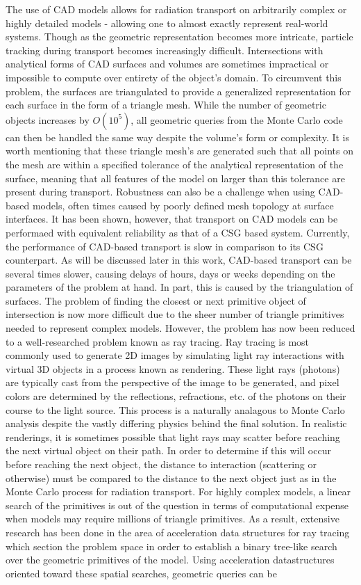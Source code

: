 \documentclass[12pt, a4paper]{article}
\begin{document}
The use of CAD models allows for radiation transport on arbitrarily complex or highly detailed models - allowing one to almost exactly represent real-world systems. Though as the geometric representation becomes more intricate, particle tracking during transport becomes increasingly difficult. Intersections with analytical forms of CAD surfaces and volumes are sometimes impractical or impossible to compute over entirety of the object's domain. To circumvent this problem, the surfaces are triangulated to provide a generalized representation for each surface in the form of a triangle mesh. While the number of geometric objects increases by $O(10^5)$, all geometric queries from the Monte Carlo code can then be handled the same way despite the volume's form or complexity. It is worth mentioning that these triangle mesh's are generated such that all points on the mesh are within a specified tolerance of the analytical representation of the surface, meaning that all features of the model on larger than this tolerance are present during transport. Robustness can also be a challenge when using CAD-based models, often times caused by poorly defined mesh topology at surface interfaces. It has been shown, however, that transport on CAD models can be performaed with equivalent reliability as that of a CSG based system\cite{Smith_2011}. Currently, the performance of CAD-based transport is slow in comparison to its CSG counterpart. As will be discussed later in this work, CAD-based transport can be several times slower, causing delays of hours, days or weeks depending on the parameters of the problem at hand. In part, this is caused by the triangulation of surfaces. The problem of finding the closest or next primitive object of intersection is now more difficult due to the sheer number of triangle primitives needed to represent complex models. However, the problem has now been reduced to a well-researched problem known as ray tracing. Ray tracing is most commonly used to generate 2D images by simulating light ray interactions with virtual 3D objects in a process known as rendering. These light rays (photons) are typically cast from the perspective of the image to be generated, and pixel colors are determined by the reflections, refractions, etc. of the photons on their course to the light source. This process is a naturally analagous to Monte Carlo analysis despite the vastly differing physics behind the final solution. In realistic renderings, it is sometimes possible that light rays may scatter before reaching the next virtual object on their path. In order to determine if this will occur before reaching the next object, the distance to interaction (scattering or otherwise) must be compared to the distance to the next object just as in the Monte Carlo process for radiation transport. For highly complex models, a linear search of the primitives is out of the question in terms of computational expense when models may require millions of triangle primitives. As a result, extensive research has been done in the area of acceleration data structures for ray tracing which section the problem space in order to establish a binary tree-like search over the geometric primitives of the model. Using acceleration datastructures oriented toward these spatial searches, geometric queries can be 
\end{document}
